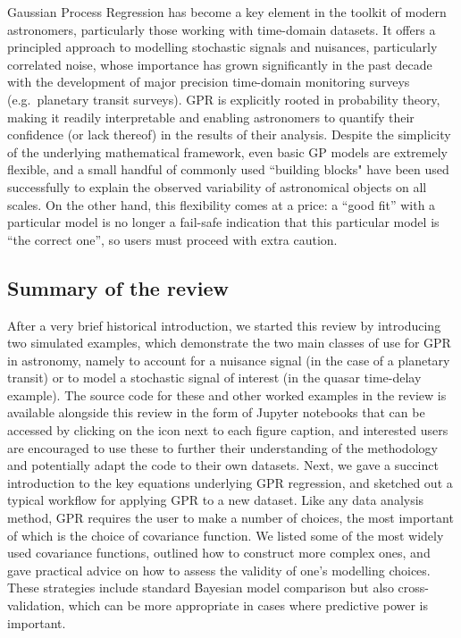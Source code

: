 \documentclass[letterpaper]{ar-1col}
\begin{document}
Gaussian Process Regression has become a key element in the toolkit of modern astronomers, particularly those working with time-domain datasets. It offers a principled approach to modelling stochastic signals and nuisances, particularly correlated noise, whose importance has grown significantly in the past decade with the development of major precision time-domain monitoring surveys (e.g.\ planetary transit surveys). GPR is explicitly 
rooted in probability theory, making it readily interpretable and enabling astronomers to quantify their confidence (or lack thereof) in the results of their analysis. Despite the simplicity of the underlying mathematical framework, even basic GP models are extremely flexible, and a small handful of commonly used ``building blocks" have been used successfully to explain the observed variability of astronomical objects on all scales. On the other hand, this flexibility comes at a price: a ``good fit'' with a particular model is no longer a fail-safe indication that this particular model is ``the correct one'', so users must proceed with extra caution. 

\subsection{Summary of the review}

After a very brief historical introduction, we started this review by introducing two simulated examples, which demonstrate the two main classes of use for GPR in astronomy, namely to account for a nuisance signal (in the case of a planetary transit) or to model a stochastic signal of interest (in the quasar time-delay example). The source code for these and other worked examples in the review is available alongside this review in the form of {\sc Jupyter} notebooks that can be accessed by clicking on the icon next to each figure caption, and interested users are encouraged to use these to further their understanding of the methodology and potentially adapt the code to their own datasets. Next, we gave a succinct introduction to the key equations underlying GPR regression, and sketched out a typical workflow for applying GPR to a new dataset. Like any data analysis method, GPR requires the user to make a number of choices, the most important of which is the choice of covariance function. We listed some of the most widely used covariance functions, outlined how to construct more complex ones, and gave practical advice on how to assess the validity of one's modelling choices. These strategies include standard Bayesian model comparison but also cross-validation, which can be more appropriate in cases where predictive power is important. 
\end{document}
